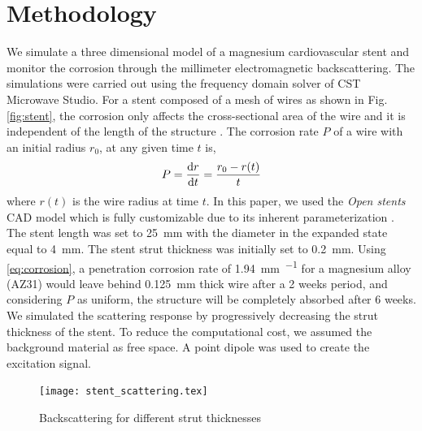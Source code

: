 \documentclass[conference,a4paper]{IEEEtran}
\begin{document}
\section{Methodology}
%
We simulate a three dimensional model of a magnesium cardiovascular stent and monitor the corrosion through the millimeter electromagnetic backscattering. The simulations were carried out using the frequency domain solver of CST Microwave Studio.  For a stent composed of a mesh of wires as shown in Fig. \ref{fig:stent}, the corrosion only affects the cross-sectional area of the wire and it is independent of the length of the structure \cite{bowen2015rates}. The corrosion rate $P$ of a wire with an initial radius $r_0$, at any given time $t$ is,
%
\begin{equation}
  P = \dv{r}{t} = \frac{r_0 - r(t)}{t}
  \label{eq:corrosion}
\end{equation}
%
where $r(t)$ is the wire radius at time $t$.
%
In this paper, we used the \emph{Open stents} CAD model which is fully customizable due to its inherent parameterization \cite{bonsignore_open_2012}. The stent length was set to \SI{25}{\mm} with the diameter in the expanded state equal to \SI{4}{\mm}. The stent strut thickness was initially set to \SI{.2}{\mm}. Using \eqref{eq:corrosion}, a penetration corrosion rate of \SI{1.94}{\mm \per \year} for a magnesium alloy (AZ31) \cite{YU2017330} would leave behind \SI{.125}{\mm} thick wire after a \num{2} weeks period, and considering $P$ as uniform, the structure will be completely absorbed after \num{6} weeks.
%
We simulated the scattering response by progressively decreasing the strut thickness of the stent. To reduce the computational cost, we assumed the background material as free space. A point dipole was used to create the excitation signal.
%
\begin{figure}[h!]
  \centering
  \texttt{[image: stent\_scattering.tex]}
  \caption{Backscattering for different strut thicknesses}
  \label{fig:bcs}
\end{figure}
%
%
%
\vspace{7pt}
\end{document}
